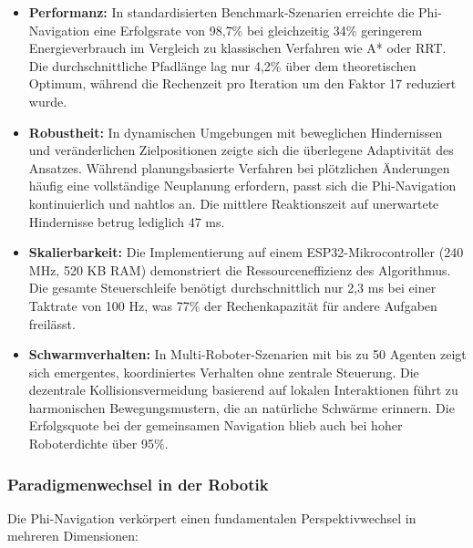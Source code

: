 ﻿\documentclass[a4paper,12pt]{article}
\theoremstyle{definition}
\begin{document}
\begin{itemize}
	\item \textbf{Performanz:} In standardisierten Benchmark-Szenarien erreichte die Phi-Navigation eine Erfolgsrate von 98{,}7\% bei gleichzeitig 34\% geringerem Energieverbrauch im Vergleich zu klassischen Verfahren wie A* oder RRT. Die durchschnittliche Pfadlänge lag nur 4{,}2\% über dem theoretischen Optimum, während die Rechenzeit pro Iteration um den Faktor 17 reduziert wurde.
	
	\item \textbf{Robustheit:} In dynamischen Umgebungen mit beweglichen Hindernissen und veränderlichen Zielpositionen zeigte sich die überlegene Adaptivität des Ansatzes. Während planungsbasierte Verfahren bei plötzlichen Änderungen häufig eine vollständige Neuplanung erfordern, passt sich die Phi-Navigation kontinuierlich und nahtlos an. Die mittlere Reaktionszeit auf unerwartete Hindernisse betrug lediglich 47 ms.
	
	\item \textbf{Skalierbarkeit:} Die Implementierung auf einem ESP32-Mikrocontroller (240 MHz, 520 KB RAM) demonstriert die Ressourceneffizienz des Algorithmus. Die gesamte Steuerschleife benötigt durchschnittlich nur 2{,}3 ms bei einer Taktrate von 100 Hz, was 77\% der Rechenkapazität für andere Aufgaben freilässt.
	
	\item \textbf{Schwarmverhalten:} In Multi-Roboter-Szenarien mit bis zu 50 Agenten zeigt sich emergentes, koordiniertes Verhalten ohne zentrale Steuerung. Die dezentrale Kollisionsvermeidung basierend auf lokalen Interaktionen führt zu harmonischen Bewegungsmustern, die an natürliche Schwärme erinnern. Die Erfolgsquote bei der gemeinsamen Navigation blieb auch bei hoher Roboterdichte über 95\%.
\end{itemize}

\subsubsection{Paradigmenwechsel in der Robotik}

Die Phi-Navigation verkörpert einen fundamentalen Perspektivwechsel in mehreren Dimensionen:
\end{document}
